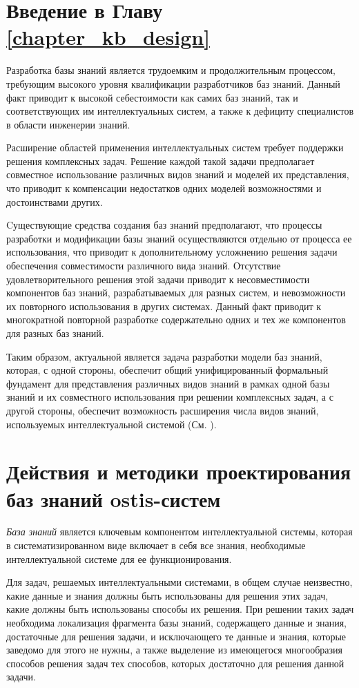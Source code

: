 \section*{Введение в Главу \ref{chapter_kb_design}}

Разработка базы знаний является трудоемким и продолжительным процессом, требующим высокого уровня квалификации разработчиков баз знаний. Данный факт приводит к высокой себестоимости как самих баз знаний, так и соответствующих им интеллектуальных систем, а также к дефициту специалистов в области инженерии знаний.

Расширение областей применения интеллектуальных систем требует поддержки решения комплексных задач.
Решение каждой такой задачи предполагает совместное использование различных видов знаний и моделей их представления, что приводит к компенсации недостатков одних моделей возможностями и достоинствами других.

Cуществующие средства создания баз знаний предполагают, что процессы разработки и модификации базы знаний осуществляются отдельно от процесса ее использования, что приводит к дополнительному усложнению решения задачи обеспечения совместимости различного вида знаний.
Отсутствие удовлетворительного решения этой задачи приводит к несовместимости компонентов баз знаний, разрабатываемых для разных систем, и невозможности их повторного использования в других системах.
Данный факт приводит к многократной повторной разработке содержательно одних и тех же компонентов для разных баз знаний.

Таким образом, актуальной является задача разработки модели баз знаний, которая, с одной стороны, обеспечит общий унифицированный формальный фундамент для представления различных видов знаний в рамках одной базы знаний и их совместного использования при решении комплексных задач, а с другой стороны, обеспечит возможность расширения числа видов знаний, используемых интеллектуальной системой (См. ). 


\section{Действия и методики проектирования баз знаний ostis-систем}
\label{sec_kb_design_methods}

\textit{База знаний} является ключевым компонентом интеллектуальной системы, которая в систематизированном виде включает в себя все знания, необходимые интеллектуальной системе для ее функционирования.

Для задач, решаемых интеллектуальными системами, в общем случае неизвестно, какие данные и знания должны быть использованы для решения этих задач, какие должны быть использованы способы их решения.
При решении таких задач необходима локализация фрагмента базы знаний, содержащего данные и знания, достаточные для решения задачи, и исключающего те данные и знания, которые заведомо для этого не нужны, а также выделение из имеющегося многообразия способов решения задач тех способов, которых достаточно для решения данной задачи.

